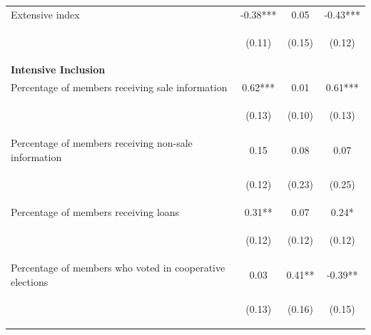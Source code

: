 \documentclass[11pt]{article}
\begin{document}
\begin{table}[H]
{\begin{tabularx}{1.1\linewidth}{lccc}
\noalign{\smallskip}Extensive index & -0.38*** & 0.05 & -0.43***\\
 & \begin{footnotesize}(0.11)\end{footnotesize} & \begin{footnotesize}(0.15)\end{footnotesize} & \begin{footnotesize}(0.12)\end{footnotesize}\\

 
 \textbf{Intensive Inclusion} & & & \\
\noalign{\smallskip}Percentage of members receiving sale information & 0.62*** & 0.01 & 0.61***\\
 & \begin{footnotesize}(0.13)\end{footnotesize} & \begin{footnotesize}(0.10)\end{footnotesize} & \begin{footnotesize}(0.13)\end{footnotesize}\\
\noalign{\smallskip}Percentage of members receiving non-sale information & 0.15 & 0.08 & 0.07\\
 & \begin{footnotesize}(0.12)\end{footnotesize} & \begin{footnotesize}(0.23)\end{footnotesize} & \begin{footnotesize}(0.25)\end{footnotesize}\\
\noalign{\smallskip}Percentage of members receiving loans & 0.31** & 0.07 & 0.24*\\
 & \begin{footnotesize}(0.12)\end{footnotesize} & \begin{footnotesize}(0.12)\end{footnotesize} & \begin{footnotesize}(0.12)\end{footnotesize}\\
\noalign{\smallskip}Percentage of members who voted in cooperative elections & 0.03 & 0.41** & -0.39**\\
 & \begin{footnotesize}(0.13)\end{footnotesize} & \begin{footnotesize}(0.16)\end{footnotesize} & \begin{footnotesize}(0.15)\end{footnotesize}\\

\end{tabularx}}
\end{table}
\end{document}
